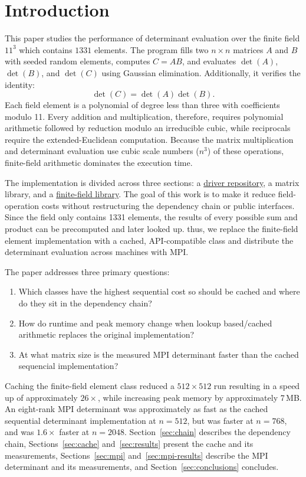 \section{Introduction}
\label{sec:introduction}

This paper studies the performance of determinant evaluation over the finite field \(11^3\) which contains \(1331\) elements.
The program fills two \(n \times n\) matrices \(A\) and \(B\) with seeded random elements, computes \(C = AB\), and evaluates \(\det(A)\), \(\det(B)\), and \(\det(C)\) using Gaussian elimination. Additionally, it verifies the identity:
\[
\det(C) = \det(A)\det(B).
\]
Each field element is a polynomial of degree less than three with coefficients modulo 11.
Every addition and multiplication, therefore, requires polynomial arithmetic followed by reduction modulo an irreducible cubic, while reciprocals require the extended-Euclidean computation.
Because the matrix multiplication and determinant evaluation use cubic scale numbers (\(n^3\)) of these operations, finite-field arithmetic dominates the execution time.

The implementation is divided across three sections: a
\href{https://github.com/hoop3r/group2-algebra-assignment}{driver repository},
a matrix library, and a
\href{https://github.com/JacobNance142/algebra-finite-fields-group2}{finite-field library}.
The goal of this work is to make it reduce field-operation costs without restructuring the dependency chain or public interfaces.
Since the field only contains 1331 elements, the results of every possible sum and product can be precomputed and later looked up.
thus, we replace the finite-field element implementation with a cached, API-compatible class and distribute the determinant evaluation across machines with MPI.

The paper addresses three primary questions:
\begin{enumerate}
  \item Which classes have the highest sequential cost so should be cached and where do they sit in the dependency chain?
  \item How do runtime and peak memory change when lookup based/cached arithmetic replaces the original implementation?
  \item At what matrix size is the measured MPI determinant faster than the cached sequencial implementation?
\end{enumerate}

Caching the finite-field element class reduced a \(512 \times 512\) run resulting in a speed up of approximately \(26 \times\), while increasing peak memory by approximately 7\,MB.
An eight-rank MPI determinant was approximately as fast as the cached sequential determinant implementation at \(n = 512\), but was faster at \(n = 768\), and was \(1.6 \times\) faster at \(n = 2048\).
Section~\ref{sec:chain} describes the dependency chain, Sections~\ref{sec:cache} and~\ref{sec:results} present the cache and its measurements, Sections~\ref{sec:mpi} and~\ref{sec:mpi-results} describe the MPI determinant and its measurements, and Section~\ref{sec:conclusions} concludes.
